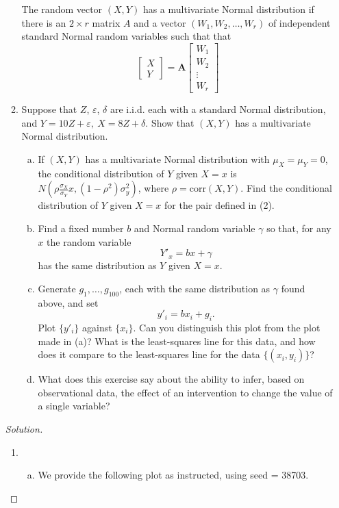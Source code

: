 \documentclass{amsart}
\begin{document}
\begin{enumerate}
\begin{enumerate}[(1)]
					The random vector $(X,Y)$ has a multivariate Normal distribution if there is an $2\times r$ matrix $A$ and a vector $(W_{1},W_{2},\dots,W_{r})$ of independent standard Normal random variables such that that 
						$$\begin{bmatrix}
							X \\
							Y
						\end{bmatrix} 
						= \mathbf{A}\begin{bmatrix}
							W_{1} \\ 
							W_{2} \\ 
							\vdots \\ 
							W_{r} 
						\end{bmatrix}$$
					\item Suppose that $Z$, $\varepsilon$, $\delta$ are i.i.d. each with a standard Normal distribution, and $Y = 10Z + \varepsilon, \ X = 8Z + \delta$. 
					Show that $(X,Y)$ has a multivariate Normal distribution.
					\begin{enumerate}[(a)]
						\item If $(X, Y)$ has a multivariate Normal distribution with $\mu_{X} = \mu_{Y} = 0$, the conditional distribution of $Y$ given $X =x$ is $N(\rho\frac{\sigma_{X}}{\sigma_{Y}}x, (1-\rho^{2})\sigma^{2}_{y})$, where $\rho=\text{corr}(X,Y)$. 
						Find the conditional distribution of $Y$ given $X = x$ for the pair defined in (2).
						\item Find a fixed number $b$ and Normal random variable $\gamma$ so that, for any $x$ the random variable $$Y'_{x} = bx + \gamma$$ has the same distribution as $Y$ given $X = x$.
						\item  Generate $g_{1},\dots,g_{100}$, each with the same distribution as $\gamma$ found above, and set $$y'_{i} = bx_{i} + g_{i}.$$ Plot $\{y'_{i}\}$ against $\{x_{i}\}$. 
						Can you distinguish this plot from the plot made in (a)? 
						What is the least-squares line for this data, and how does it compare to the least-squares line for the data $\{(x_{i}, y_{i})\}$?
						\item What does this exercise say about the ability to infer, based on observational data, the effect of an intervention to change the value of a single variable?
					\end{enumerate}
			\end{enumerate}
		\begin{proof}[Solution]\
			\begin{enumerate}[(1)]
				\item \
				\begin{enumerate}[(a)]
					\item We provide the following plot as instructed, using seed = 38703.
					

\end{enumerate}
\end{enumerate}
\end{proof}
\end{enumerate}
\end{document}
